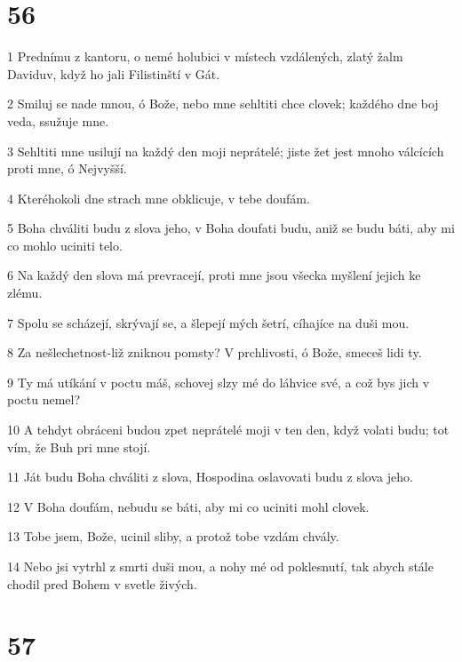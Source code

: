 \chapter{56}

\par 1 Prednímu z kantoru, o nemé holubici v místech vzdálených, zlatý žalm Daviduv, když ho jali Filistinští v Gát.
\par 2 Smiluj se nade mnou, ó Bože, nebo mne sehltiti chce clovek; každého dne boj veda, ssužuje mne.
\par 3 Sehltiti mne usilují na každý den moji neprátelé; jiste žet jest mnoho válcících proti mne, ó Nejvyšší.
\par 4 Kteréhokoli dne strach mne obklicuje, v tebe doufám.
\par 5 Boha chváliti budu z slova jeho, v Boha doufati budu, aniž se budu báti, aby mi co mohlo uciniti telo.
\par 6 Na každý den slova má prevracejí, proti mne jsou všecka myšlení jejich ke zlému.
\par 7 Spolu se scházejí, skrývají se, a šlepejí mých šetrí, cíhajíce na duši mou.
\par 8 Za nešlechetnost-liž zniknou pomsty? V prchlivosti, ó Bože, smeceš lidi ty.
\par 9 Ty má utíkání v poctu máš, schovej slzy mé do láhvice své, a což bys jich v poctu nemel?
\par 10 A tehdyt obráceni budou zpet neprátelé moji v ten den, když volati budu; tot vím, že Buh pri mne stojí.
\par 11 Ját budu Boha chváliti z slova, Hospodina oslavovati budu z slova jeho.
\par 12 V Boha doufám, nebudu se báti, aby mi co uciniti mohl clovek.
\par 13 Tobe jsem, Bože, ucinil sliby, a protož tobe vzdám chvály.
\par 14 Nebo jsi vytrhl z smrti duši mou, a nohy mé od poklesnutí, tak abych stále chodil pred Bohem v svetle živých.

\chapter{57}

